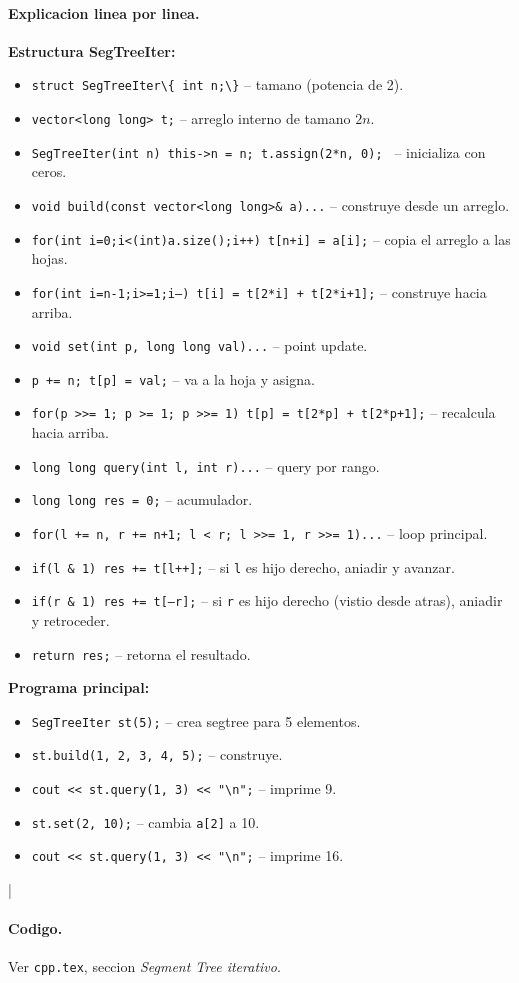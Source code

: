\paragraph{Explicacion linea por linea.}
\textbf{Estructura SegTreeIter:}
\begin{itemize}\setlength\itemsep{0pt}
	\item \verb|struct SegTreeIter\{ int n;\}| -- tamano (potencia de 2).
	\item \texttt{vector<long long> t;} -- arreglo interno de tamano $2n$.
	\item \texttt{SegTreeIter(int n){ this->n = n; t.assign(2*n, 0); }} -- inicializa con ceros.
	\item \texttt{void build(const vector<long long>\& a){...}} -- construye desde un arreglo.
	\item \texttt{for(int i=0;i<(int)a.size();i++) t[n+i] = a[i];} -- copia el arreglo a las hojas.
	\item \texttt{for(int i=n-1;i>=1;i--) t[i] = t[2*i] + t[2*i+1];} -- construye hacia arriba.
	\item \texttt{void set(int p, long long val){...}} -- point update.
	\item \texttt{p += n; t[p] = val;} -- va a la hoja y asigna.
	\item \texttt{for(p >>= 1; p >= 1; p >>= 1) t[p] = t[2*p] + t[2*p+1];} -- recalcula hacia arriba.
	\item \texttt{long long query(int l, int r){...}} -- query por rango.
	\item \texttt{long long res = 0;} -- acumulador.
	\item \texttt{for(l += n, r += n+1; l < r; l >>= 1, r >>= 1){...}} -- loop principal.
	\item \texttt{if(l \& 1) res += t[l++];} -- si \texttt{l} es hijo derecho, aniadir y avanzar.
	\item \texttt{if(r \& 1) res += t[--r];} -- si \texttt{r} es hijo derecho (vistio desde atras), aniadir y retroceder.
	\item \texttt{return res;} -- retorna el resultado.
\end{itemize}
\textbf{Programa principal:}
\begin{itemize}\setlength\itemsep{0pt}
	\item \texttt{SegTreeIter st(5);} -- crea segtree para 5 elementos.
	\item \texttt{st.build({1, 2, 3, 4, 5});} -- construye.
	\item \texttt{cout << st.query(1, 3) << "\textbackslash n";} -- imprime 9.
	\item \texttt{st.set(2, 10);} -- cambia \texttt{a[2]} a 10.
	\item \texttt{cout << st.query(1, 3) << "\textbackslash n";} -- imprime 16.
\end{itemize}
|\paragraph{Codigo.}
Ver \texttt{cpp.tex}, seccion \textit{Segment Tree iterativo}.

\vspace{0.5em|||}